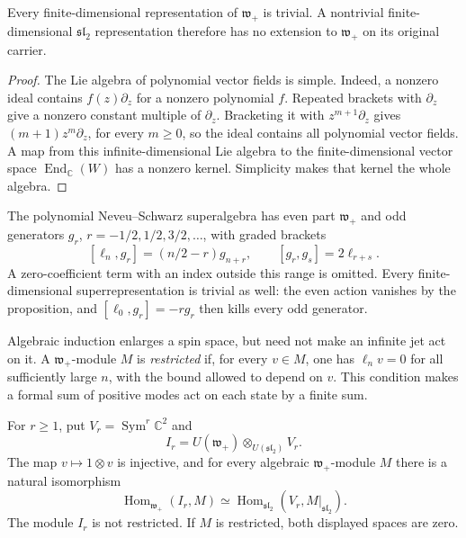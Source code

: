\begin{proposition}\label{pcsm:prop:witt-finite}
Every finite-dimensional representation of \(\mathfrak w_+\) is
trivial. A nontrivial finite-dimensional \(\mathfrak{sl}_2\)
representation therefore has no extension to \(\mathfrak w_+\)
on its original carrier.
\end{proposition}

\begin{proof}
The Lie algebra of polynomial vector fields is simple.
Indeed, a nonzero ideal contains \(f(z)\partial_z\) for a
nonzero polynomial \(f\).
Repeated brackets with \(\partial_z\) give a nonzero constant
multiple of \(\partial_z\).
Bracketing it with \(z^{m+1}\partial_z\) gives
\((m+1)z^m\partial_z\), for every \(m\geq0\), so the ideal
contains all polynomial vector fields.
A map from this infinite-dimensional Lie algebra to the
finite-dimensional vector space \(\operatorname{End}_{\mathbb C}(W)\)
has a nonzero kernel. Simplicity makes that kernel the whole algebra.
\end{proof}

The polynomial Neveu--Schwarz superalgebra has even part
\(\mathfrak w_+\) and odd generators
\(g_r\), \(r=-1/2,1/2,3/2,\ldots\), with graded brackets
\[
 [\ell_n,g_r]=(n/2-r)g_{n+r},\qquad
 [g_r,g_s]=2\ell_{r+s}.
\]
A zero-coefficient term with an index outside this range is omitted.
Every finite-dimensional superrepresentation is trivial as well:
the even action vanishes by the proposition, and
\([\ell_0,g_r]=-r g_r\) then kills every odd generator.

Algebraic induction enlarges a spin space, but need not make an
infinite jet act on it. A \(\mathfrak w_+\)-module \(M\) is
\emph{restricted} if, for every \(v\in M\), one has
\(\ell_n v=0\) for all sufficiently large \(n\), with the bound
allowed to depend on \(v\). This condition makes a formal sum of
positive modes act on each state by a finite sum.

\begin{proposition}\label{pcsm:prop:induced-restricted}
For \(r\geq1\), put \(V_r=\operatorname{Sym}^r\mathbb C^2\) and
\[
 I_r=U(\mathfrak w_+)\otimes_{U(\mathfrak{sl}_2)}V_r.
\]
The map \(v\mapsto1\otimes v\) is injective, and for every
algebraic \(\mathfrak w_+\)-module \(M\) there is a natural
isomorphism
\[
 \operatorname{Hom}_{\mathfrak w_+}(I_r,M)
 \simeq\operatorname{Hom}_{\mathfrak{sl}_2}
                 (V_r,M|_{\mathfrak{sl}_2}).
\]
The module \(I_r\) is not restricted. If \(M\) is restricted,
both displayed spaces are zero.
\end{proposition}

